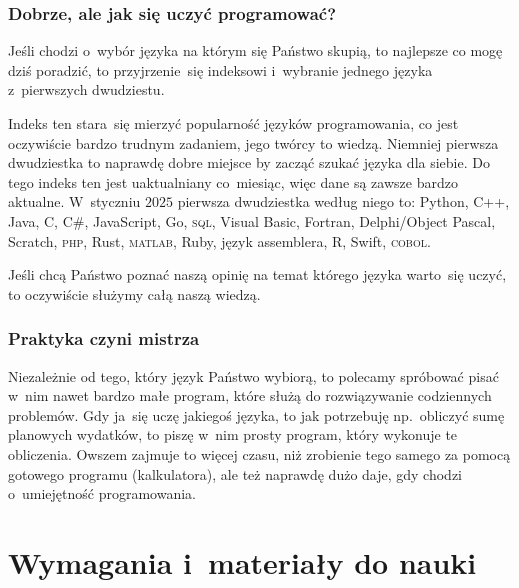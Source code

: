 \documentclass[10pt,t]{beamer}
\begin{document}
\begin{frame}
  \frametitle{Dobrze, ale jak się uczyć programować?}


  Jeśli chodzi o~wybór języka na którym się Państwo skupią, to najlepsze co
  mogę dziś poradzić, to przyjrzenie~się indeksowi
  i~wybranie jednego języka z~pierwszych dwudziestu.

  Indeks ten stara~się mierzyć popularność języków programowania, co jest
  oczywiście bardzo trudnym zadaniem, jego twórcy to wiedzą. Niemniej
  pierwsza dwudziestka to naprawdę dobre miejsce by zacząć
  szukać języka dla siebie. Do tego indeks ten jest uaktualniany
  co~miesiąc, więc dane są zawsze bardzo aktualne. W~styczniu $2025$
  pierwsza dwudziestka według niego to: Python, C++, Java, C, C\#,
  JavaScript, Go, \textsc{sql}, Visual Basic, Fortran, Delphi/Object Pascal,
  Scratch, \textsc{php}, Rust, \textsc{matlab}, Ruby, język assemblera,
  R, Swift, \textsc{cobol}.

  Jeśli chcą Państwo poznać naszą opinię na temat którego języka warto~się
  uczyć, to oczywiście służymy całą naszą wiedzą.

\end{frame}





\begin{frame}
  \frametitle{Praktyka czyni mistrza}


  Niezależnie od tego, który język Państwo wybiorą, to polecamy spróbować
  pisać w~nim nawet bardzo małe program, które służą do rozwiązywanie
  codziennych problemów. Gdy ja~się uczę jakiegoś języka, to jak potrzebuję
  np.~obliczyć sumę planowych wydatków, to piszę w~nim prosty program, który
  wykonuje te obliczenia. Owszem zajmuje to więcej czasu, niż zrobienie
  tego samego za pomocą gotowego programu (kalkulatora), ale też
  naprawdę dużo daje, gdy chodzi o~umiejętność programowania.

\end{frame}










\section{Wymagania i~materiały do nauki}
\end{document}
